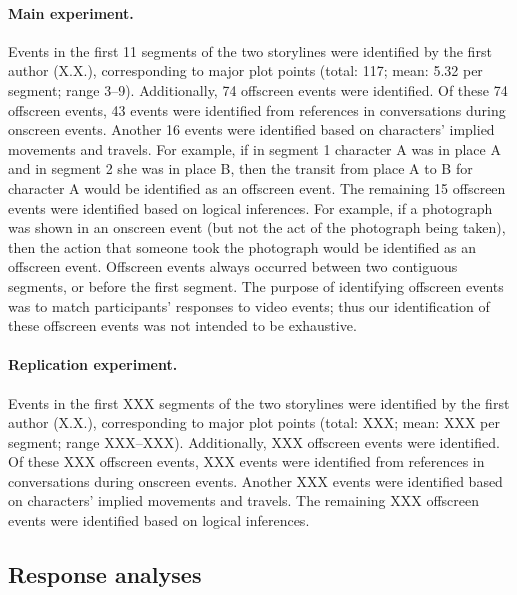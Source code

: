 \documentclass[10pt]{article}
\begin{document}
\paragraph{Main experiment.}
Events in the first 11 segments of the two storylines were identified by the
first author (X.X.), corresponding to major plot points (total: 117; mean: 5.32
per segment; range 3--9). Additionally, 74 offscreen events were identified. Of
these 74 offscreen events, 43 events were identified from references in
conversations during onscreen events. Another 16 events were identified based
on characters’ implied movements and travels. For example, if in segment 1
character A was in place A and in segment 2 she was in place B, then the
transit from place A to B for character A would be identified as an offscreen
event. The remaining 15 offscreen events were identified based on logical
inferences. For example, if a photograph was shown in an onscreen event (but
not the act of the photograph being taken), then the action that someone took
the photograph would be identified as an offscreen event. Offscreen events
always occurred between two contiguous segments, or before the first segment.
The purpose of identifying offscreen events was to match participants’
responses to video events; thus our identification of these offscreen events
was not intended to be exhaustive.

\paragraph{Replication experiment.} Events in the first XXX segments of the two
storylines were identified by the first author (X.X.), corresponding to major
plot points (total: XXX; mean: XXX per segment; range XXX--XXX). Additionally,
XXX offscreen events were identified. Of these XXX offscreen events, XXX events
were identified from references in conversations during onscreen events.
Another XXX events were identified based on characters’ implied movements and
travels. The remaining XXX offscreen events were identified based on logical
inferences.

\subsection*{Response analyses}
\end{document}
